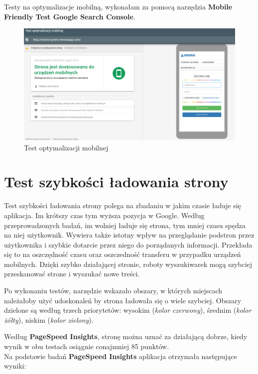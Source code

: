 \documentclass[openright]{xmgr}
\begin{document}
	Testy na optymalizacje mobilną, wykonałam za pomocą narzędzia \textbf{Mobile Friendly Test Google Search Console}.
	
	\begin{figure}[!tbh]
		\centering
		\includegraphics[width=\linewidth]{image/testm}
		\caption{Test optymalizacji mobilnej}
	\end{figure}
	
	\chapter{Test szybkości ładowania strony}
	Test szybkości ładowania strony polega na zbadaniu w jakim czasie ładuje się aplikacja. Im krótszy czas tym wyższa pozycja w Google. Według przeprowadzonych badań, im wolniej ładuje się strona, tym mniej czasu spędza na niej użytkownik. Wywiera także istotny wpływ na przeglądanie podstron przez użytkownika i szybkie dotarcie przez niego do porządanych informacji. Przekłada się to na oszczędność czasu oraz oszczedność transferu w przypadku urządzeń mobilnych. Dzięki szybko działającej stronie, roboty wyszukiwarek mogą szybciej przeskanować strone i wyszukać nowe treści.
	
	Po wykonaniu testów, narzędzie wskazało obszary, w których miejscach należałoby użyć udoskonaleń by strona ładowała się o wiele szybciej. Obszary dzielone są według trzech priorytetów: wysokim (\textit{kolor czerwony}), średnim (\textit{kolor żółty}), niskim (\textit{kolor zielony}).
	
	Według \textbf{PageSpeed Insights}, stronę można uznać za działającą dobrze, kiedy wynik w obu testach osiągnie conajmniej 85 punktów.\\
	
	\newpage
	Na podstawie badań \textbf{PageSpeed Insights} aplikacja otrzymała następujące wyniki: 	
	
\end{document}
